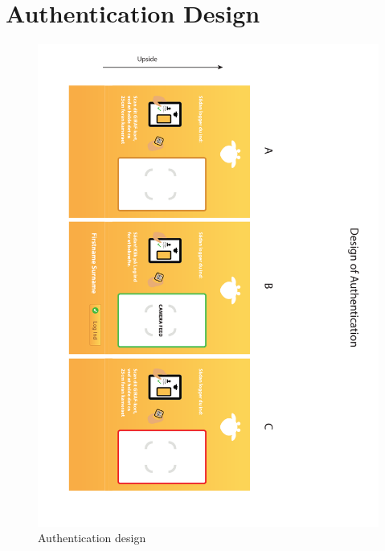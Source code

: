 \chapter{Authentication Design}
\label{app:design:authentication}
\begin{figure}[h!]
	\centering
	\includegraphics[width=\textwidth]{gfx/appendix_design_authentication.pdf}
	\caption{Authentication design}
	
\end{figure}

